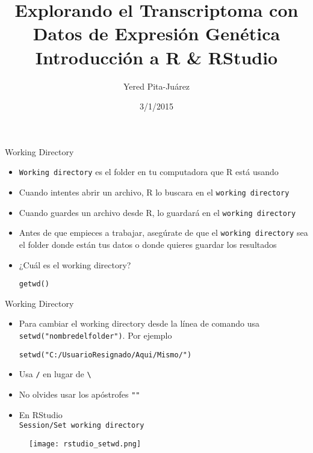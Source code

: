 \documentclass{beamer}
\begin{document}
\title[Introducción a R \& RStudio]{Explorando el Transcriptoma con Datos de Expresi\'{o}n Gen\'{e}tica\\
\vspace{0.5cm}
Introducción a R \& RStudio}
\author{Yered Pita-Ju\'{a}rez}
\date{3/1/2015}


\begin{frame}
\titlepage
\end{frame}

\begin{frame}[fragile]{Working Directory}
\begin{itemize}
\item \texttt{Working directory} es el folder en tu computadora que R está usando
\item Cuando intentes abrir un archivo, R lo buscara en el \texttt{working directory}
\item Cuando guardes un archivo desde R, lo guardará en el \texttt{working directory}
\item Antes de que empieces a trabajar, asegúrate de que el \texttt{working directory} sea el folder donde están tus datos o donde quieres guardar los resultados
\item ¿Cuál es el working directory?
\begin{verbatim}
getwd()
\end{verbatim}

\end{itemize}
\end{frame}

\begin{frame}[fragile]{Working Directory}
\begin{itemize}
\item Para cambiar el working directory desde la línea de comando usa \texttt{setwd("nombredelfolder")}. Por ejemplo
\begin{verbatim}
setwd("C:/UsuarioResignado/Aqui/Mismo/")
\end{verbatim}
\item Usa \verb=/= en lugar de \verb=\=
\item No olvides usar los apóstrofes \verb=""=
\item En RStudio\\
\texttt{Session/Set working directory}
\end{itemize}
\begin{figure}[H]
\centering
\texttt{[image: rstudio\_setwd.png]}
\end{figure}
\end{frame}
\end{document}

